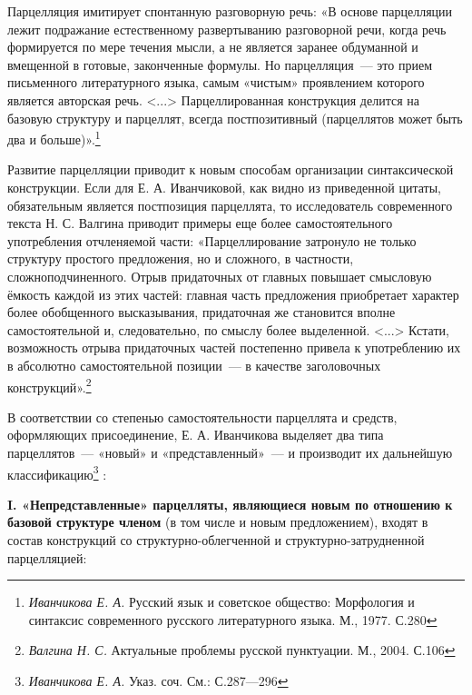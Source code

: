 \documentclass{kursa4}
\begin{document}
{      {Парцелляция имитирует спонтанную разговорную речь: «В основе парцелляции лежит подражание естественному развертыванию разговорной речи, когда речь формируется по мере течения мысли, а не является заранее обдуманной и вмещенной в готовые, законченные формулы. Но парцелляция~--- это прием письменного литературного языка, самым «чистым» проявлением которого является авторская речь. \textless{}...\textgreater{} Парцеллированная конструкция делится на базовую структуру и парцеллят, }{всегда постпозитивный}{ (парцеллятов может быть два и больше)».}\footnote{\textit{{ Иванчикова Е. А. }}{Русский язык и советское общество: Морфология и синтаксис современного русского литературного языка. М., 1977.}\textit{{
      }}{С.280}}{ }

      {Развитие парцелляции приводит к новым способам организации синтаксической конструкции. Если для Е. А. Иванчиковой, как видно из приведенной цитаты, обязательным является постпозиция парцеллята, то исследователь современного текста Н. С. Валгина приводит примеры еще более самостоятельного употребления отчленяемой части: «Парцеллирование затронуло не только структуру простого предложения, но и сложного, в частности, сложноподчиненного. Отрыв придаточных от главных повышает смысловую ёмкость каждой из этих частей: главная часть предложения }{приобретает характер более обо}{б}{щенного высказывания, придаточная же становится вполне самостоятельной и, следовательно, по смыслу более выделенной. \textless{}...\textgreater{} Кстати, возможность отрыва придаточных частей постепенно привела к употреблению их в абсолютно самостоятельной позиции~--- в качестве заголовочных конструкций».}\footnote{\textit{{ Валгина Н. С. }}{Актуальные проблемы русской пунктуации. М., 2004. С.106}}{ }

      {В соответствии со степенью самостоятельности парцеллята и средств, оформляющих присоединение, Е. А. Иванчикова выделяет два типа парцеллятов~--- «новый» и «представленный»~--- и производит их дальнейшую классификацию}\footnote{\textit{{Иванчикова Е. А. }}{Указ. соч. См.: С.287—296}}{ :}

      \textbf{I. «Непредставленные» парцелляты, являющиеся новым по отношению к базовой структуре членом} (в том числе и новым предложением), входят в состав конструкций со структурно-облегченной и структурно-затрудненной парцелляцией:

}
\end{document}
